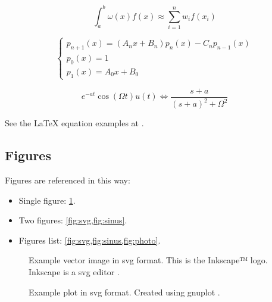 \begin{equation} \label{eq:example}
\int_{a}^{b} \omega(x) f(x) \approx \sum_{i=1}^n w_i f(x_i)
\end{equation}

\begin{equation} \label{eq:example2}
\begin{cases}
p_{n+1}(x) = (A_n x + B_n) p_n(x) - C_n p_{n-1}(x) \\
p_0(x) = 1 \\
p_1(x) = A_0 x + B_0
\end{cases}
\end{equation}

\begin{equation} \label{eq:example3}
e^{ - at} \cos (\Omega t)u(t) \Leftrightarrow
\frac{{s + a}}{{(s + a)^2  + \Omega ^2 }}
\end{equation}

See the LaTeX equation examples at \cite{equationsheet,SO-latex-equations}.

\subsection{Figures}
Figures are referenced in this way:
\begin{itemize}
\item Single figure: \cref{fig:svg}.
\item Two figures: \cref{fig:svg,fig:sinus}.
\item Figures list: \cref{fig:svg,fig:sinus,fig:photo}.
\end{itemize}

\begin{figure}

\caption{\label{fig:svg} Example vector image in svg format. This is the
Inkscape™ logo. Inkscape is a \gls{svg} editor \cite{inkscape}.}
\end{figure}

\begin{figure}

\caption{\label{fig:sinus} Example plot in svg format. Created using gnuplot
\cite{gnuplot}.}
\end{figure}

